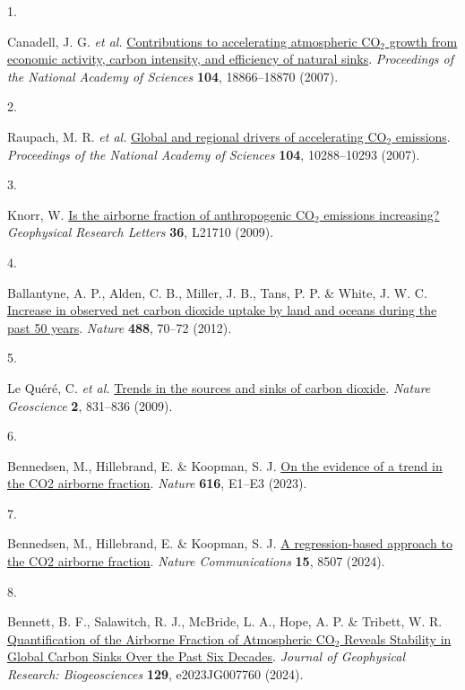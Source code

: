 \documentclass[
  12pt,
  letterpaper,
  DIV=11,
  numbers=noendperiod]{scrartcl}
\newlength{\cslhangindent}
\newlength{\csllabelwidth}
\newenvironment{CSLReferences}[2] %
 {\begin{list}{}{%
  \setlength{\itemindent}{0pt}
  \setlength{\leftmargin}{0pt}
  \setlength{\parsep}{0pt}
  \ifodd #1
   \setlength{\leftmargin}{\cslhangindent}
   \setlength{\itemindent}{-1\cslhangindent}
  \fi
  \setlength{\itemsep}{#2\baselineskip}}}
 {\end{list}}
\newcommand{\CSLLeftMargin}[1]{\parbox[t]{\csllabelwidth}{\strut#1\strut}}
\newcommand{\CSLRightInline}[1]{\parbox[t]{\linewidth - \csllabelwidth}{\strut#1\strut}}
\begin{document}
\protect{}\label{refs}
\begin{CSLReferences}{0}{0}
\CSLLeftMargin{1. }%
\CSLRightInline{Canadell, J. G. \emph{et al.}
\href{https://doi.org/10.1073/pnas.0702737104}{Contributions to
accelerating atmospheric {CO\(_2\)} growth from economic activity,
carbon intensity, and efficiency of natural sinks}. \emph{Proceedings of
the National Academy of Sciences} \textbf{104}, 18866--18870 (2007).}

\CSLLeftMargin{2. }%
\CSLRightInline{Raupach, M. R. \emph{et al.}
\href{https://doi.org/10.1073/pnas.0700609104}{Global and regional
drivers of accelerating {CO\(_2\)} emissions}. \emph{Proceedings of the
National Academy of Sciences} \textbf{104}, 10288--10293 (2007).}

\CSLLeftMargin{3. }%
\CSLRightInline{Knorr, W. \href{https://doi.org/10.1029/2009GL040613}{Is
the airborne fraction of anthropogenic {CO\(_2\)} emissions increasing?}
\emph{Geophysical Research Letters} \textbf{36}, L21710 (2009).}

\CSLLeftMargin{4. }%
\CSLRightInline{Ballantyne, A. P., Alden, C. B., Miller, J. B., Tans, P.
P. \& White, J. W. C.
\href{https://doi.org/10.1038/nature11299}{Increase in observed net
carbon dioxide uptake by land and oceans during the past 50 years}.
\emph{Nature} \textbf{488}, 70--72 (2012).}

\CSLLeftMargin{5. }%
\CSLRightInline{Le Quéré, C. \emph{et al.}
\href{https://doi.org/10.1038/ngeo689}{Trends in the sources and sinks
of carbon dioxide}. \emph{Nature Geoscience} \textbf{2}, 831--836
(2009).}

\CSLLeftMargin{6. }%
\CSLRightInline{Bennedsen, M., Hillebrand, E. \& Koopman, S. J.
\href{https://doi.org/10.1038/s41586-023-05871-6}{On the evidence of a
trend in the {CO2} airborne fraction}. \emph{Nature} \textbf{616},
E1--E3 (2023).}

\CSLLeftMargin{7. }%
\CSLRightInline{Bennedsen, M., Hillebrand, E. \& Koopman, S. J.
\href{https://doi.org/10.1038/s41467-024-52728-1}{A regression-based
approach to the {CO2} airborne fraction}. \emph{Nature Communications}
\textbf{15}, 8507 (2024).}

\CSLLeftMargin{8. }%
\CSLRightInline{Bennett, B. F., Salawitch, R. J., McBride, L. A., Hope,
A. P. \& Tribett, W. R.
\href{https://doi.org/10.1029/2023JG007760}{Quantification of the
{Airborne} {Fraction} of {Atmospheric} {CO}\(_{\textrm{2}}\) {Reveals}
{Stability} in {Global} {Carbon} {Sinks} {Over} the {Past} {Six}
{Decades}}. \emph{Journal of Geophysical Research: Biogeosciences}
\textbf{129}, e2023JG007760 (2024).}


\end{CSLReferences}
\end{document}
